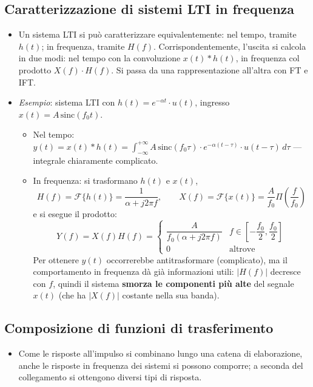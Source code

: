\documentclass[12pt, a4paper]{article}
\begin{document}
\subsection{Caratterizzazione di sistemi LTI in frequenza}
\begin{itemize}
    \item Un sistema LTI si può caratterizzare equivalentemente: nel tempo, tramite $h(t)$; in frequenza, tramite $H(f)$. Corrispondentemente, l'uscita si calcola in due modi: nel tempo con la convoluzione $x(t)*h(t)$, in frequenza col prodotto $X(f)\cdot H(f)$. Si passa da una rappresentazione all'altra con FT e IFT.
    \item \textit{Esempio}: sistema LTI con $h(t)=e^{-\alpha t}\cdot u(t)$, ingresso $x(t)=A\,\text{sinc}(f_0t)$.
    \begin{itemize}
        \item Nel tempo: $y(t) = x(t)*h(t) = \displaystyle\int_{-\infty}^{+\infty} A\,\text{sinc}(f_0\tau)\cdot e^{-\alpha(t-\tau)}\cdot u(t-\tau)\,d\tau$ — integrale chiaramente complicato.
        \item In frequenza: si trasformano $h(t)$ e $x(t)$,
        $$H(f)=\mathcal{F}\{h(t)\}=\frac{1}{\alpha+j2\pi f}, \qquad X(f)=\mathcal{F}\{x(t)\}=\frac{A}{f_0}\Pi\!\left(\frac{f}{f_0}\right)$$
        e si esegue il prodotto:
        $$Y(f)=X(f)H(f)=\begin{cases}\dfrac{A}{f_0(\alpha+j2\pi f)} & f\in\left[-\dfrac{f_0}{2},\dfrac{f_0}{2}\right] \\ 0 & \text{altrove}\end{cases}$$
        Per ottenere $y(t)$ occorrerebbe antitrasformare (complicato), ma il comportamento in frequenza dà già informazioni utili: $|H(f)|$ decresce con $f$, quindi il sistema \textbf{smorza le componenti più alte} del segnale $x(t)$ (che ha $|X(f)|$ costante nella sua banda).
    \end{itemize}
\end{itemize}

\subsection{Composizione di funzioni di trasferimento}
\begin{itemize}
    \item Come le risposte all'impulso si combinano lungo una catena di elaborazione, anche le risposte in frequenza dei sistemi si possono comporre; a seconda del collegamento si ottengono diversi tipi di risposta.
\end{itemize}
\end{document}
